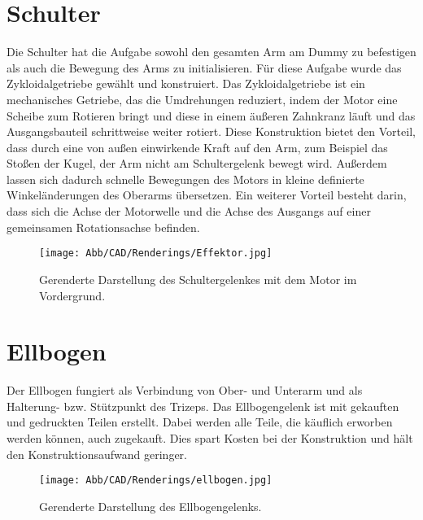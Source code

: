 	\section{Schulter}
		Die Schulter hat die Aufgabe sowohl den gesamten Arm am Dummy zu befestigen als auch die Bewegung des Arms zu initialisieren.
		Für diese Aufgabe wurde das Zykloidalgetriebe gewählt und konstruiert.
		Das Zykloidalgetriebe ist ein mechanisches Getriebe, das die Umdrehungen reduziert, indem der Motor eine Scheibe zum Rotieren bringt und diese in einem äußeren Zahnkranz läuft und das Ausgangsbauteil schrittweise weiter rotiert.
		Diese Konstruktion bietet den Vorteil, dass durch eine von außen einwirkende Kraft auf den Arm, zum Beispiel das Stoßen der Kugel, der Arm nicht am Schultergelenk bewegt wird.
		Außerdem lassen sich dadurch schnelle Bewegungen des Motors in kleine definierte Winkeländerungen des Oberarms übersetzen.
		Ein weiterer Vorteil besteht darin, dass sich die Achse der Motorwelle und die Achse des Ausgangs auf einer gemeinsamen Rotationsachse befinden.
		\begin{figure}[h]
			\centering
			\texttt{[image: Abb/CAD/Renderings/Effektor.jpg]}
			\caption[Gerenderte Darstellung des Schultergelenkes]{Gerenderte Darstellung des Schultergelenkes mit dem Motor im Vordergrund.}%
			\label{fig:rendering effektor}
		\end{figure}

	
	\section{Ellbogen}
		Der Ellbogen fungiert als Verbindung von Ober- und Unterarm und als Halterung- bzw. Stützpunkt des Trizeps.
		Das Ellbogengelenk ist mit gekauften und gedruckten Teilen erstellt.
		Dabei werden alle Teile, die käuflich erworben werden können, auch zugekauft.
		Dies spart Kosten bei der Konstruktion und hält den Konstruktionsaufwand geringer.
		\begin{figure}[h]
			\centering
			\texttt{[image: Abb/CAD/Renderings/ellbogen.jpg]}
			\caption[Gerenderte Darstellung des Ellbogengelenks]{Gerenderte Darstellung des Ellbogengelenks.}%
			\label{fig:rendering ellbogen}
		\end{figure}
	

